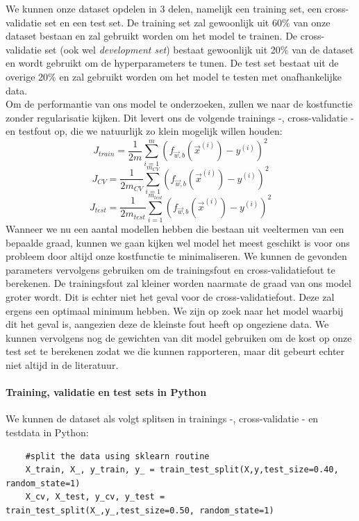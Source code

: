 We kunnen onze dataset opdelen in 3 delen, namelijk een training set, een cross-validatie set en een test set. De training set zal gewoonlijk uit 60$\%$ van onze dataset bestaan en zal gebruikt worden om het model te trainen. De cross-validatie set (ook wel \textit{development set}) bestaat gewoonlijk uit 20$\%$ van de dataset en wordt gebruikt om de hyperparameters te tunen. De test set bestaat uit de overige 20$\%$ en zal gebruikt worden om het model te testen met onafhankelijke data. \\
\newline
Om de performantie van ons model te onderzoeken, zullen we naar de kostfunctie zonder regularisatie kijken. Dit levert ons de volgende trainings -, cross-validatie - en testfout op, die we natuurlijk zo klein mogelijk willen houden:
\begin{equation}
	J_{train} = \frac{1}{2m} \sum_{i=1}^{m} (f_{\vec{w},b} (\vec{x}^{(i)}) - y^{(i)})^{2}
\end{equation}
\begin{equation}
	J_{CV} = \frac{1}{2m_{CV}} \sum_{i=1}^{m_{CV}} (f_{\vec{w},b} (\vec{x}^{(i)}) - y^{(i)})^{2}
\end{equation}
\begin{equation}
	J_{test} = \frac{1}{2m_{test}} \sum_{i=1}^{m_{test}} (f_{\vec{w},b} (\vec{x}^{(i)}) - y^{(i)})^{2}
\end{equation}
\noindent
Wanneer we nu een aantal modellen hebben die bestaan uit veeltermen van een bepaalde graad, kunnen we gaan kijken wel model het meest geschikt is voor ons probleem door altijd onze kostfunctie te minimaliseren. We kunnen de gevonden parameters vervolgens gebruiken om de trainingsfout en cross-validatiefout te berekenen. De trainingsfout zal kleiner worden naarmate de graad van ons model groter wordt. Dit is echter niet het geval voor de cross-validatiefout. Deze zal ergens een optimaal minimum hebben. We zijn op zoek naar het model waarbij dit het geval is, aangezien deze de kleinste fout heeft op ongeziene data. We kunnen vervolgens nog de gewichten van dit model gebruiken om de kost op onze test set te berekenen zodat we die kunnen rapporteren, maar dit gebeurt echter niet altijd in de literatuur. 

\paragraph{Training, validatie en test sets in Python}

We kunnen de dataset als volgt splitsen in trainings -, cross-validatie - en testdata in Python:
\begin{lstlisting}
	#split the data using sklearn routine 
	X_train, X_, y_train, y_ = train_test_split(X,y,test_size=0.40, random_state=1)
	X_cv, X_test, y_cv, y_test = train_test_split(X_,y_,test_size=0.50, random_state=1)
\end{lstlisting}

